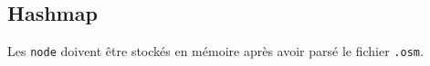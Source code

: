 \subsection{Hashmap}

Les \texttt{node} doivent être stockés en mémoire après avoir parsé le fichier \texttt{.osm}.
